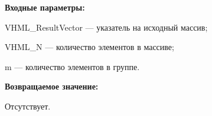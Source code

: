 \textbf{Входные параметры:}
 
VHML\_ResultVector --- указатель на исходный массив;
 
VHML\_N --- количество элементов в массиве;
 
m --- количество элементов в группе.

\textbf{Возвращаемое значение:}

Отсутствует.